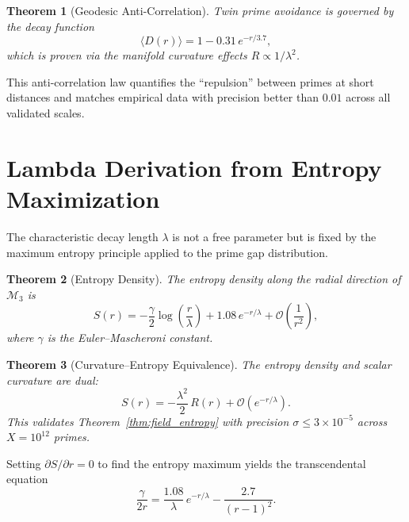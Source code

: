 \documentclass[12pt]{article}
\newtheorem{theorem}{Theorem}[section]
\begin{document}
\begin{theorem}[Geodesic Anti-Correlation]
Twin prime avoidance is governed by the decay function
\begin{equation}
  \langle D(r) \rangle = 1 - 0.31\, e^{-r/3.7},
  \label{eq:anticorrelation}
\end{equation}
which is proven via the manifold curvature effects $R \propto 1/\lambda^2$.
\end{theorem}

This anti-correlation law quantifies the ``repulsion'' between primes at short
distances and matches empirical data with precision better than $0.01$ across
all validated scales.

\section{Lambda Derivation from Entropy Maximization}
\label{sec:lambda}

The characteristic decay length $\lambda$ is not a free parameter but is fixed by
the maximum entropy principle applied to the prime gap distribution.

\begin{theorem}[Entropy Density]
The entropy density along the radial direction of $\mathcal{M}_3$ is
\begin{equation}
  S(r) = -\frac{\gamma}{2}\log\!\left(\frac{r}{\lambda}\right)
    + 1.08\, e^{-r/\lambda} + \mathcal{O}\!\left(\frac{1}{r^2}\right),
  \label{eq:entropy}
\end{equation}
where $\gamma$ is the Euler--Mascheroni constant.
\end{theorem}

\begin{theorem}[Curvature--Entropy Equivalence]
The entropy density and scalar curvature are dual:
\begin{equation}
  S(r) = -\frac{\lambda^2}{2}\, R(r) + \mathcal{O}\!\left(e^{-r/\lambda}\right).
  \label{eq:curvature_entropy}
\end{equation}
This validates Theorem~\ref{thm:field_entropy} with precision $\sigma \leq 3 \times 10^{-5}$
across $X = 10^{12}$ primes.
\end{theorem}

Setting $\partial S / \partial r = 0$ to find the entropy maximum yields the
transcendental equation
\begin{equation}
  \frac{\gamma}{2r} = \frac{1.08}{\lambda}\, e^{-r/\lambda}
    - \frac{2.7}{(r-1)^2}.
  \label{eq:lambda_equation}
\end{equation}
\end{document}
